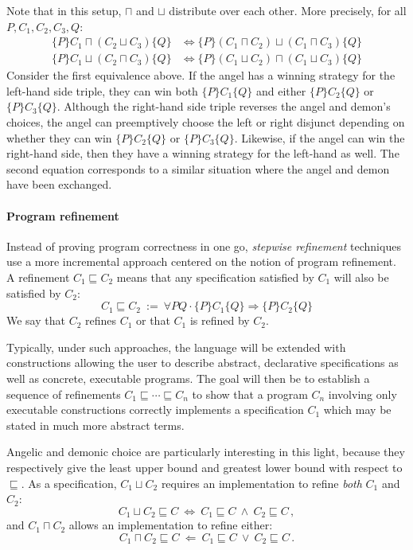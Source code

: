 \documentclass[format=sigplan,authordraft]{acmart}
\newcommand{\htr}[3]{{ \{{#1}\} {#2} \{{#3}\} }}
\begin{document}
Note that in this setup,
$\sqcap$ and $\sqcup$ distribute over each other.
More precisely, for all $P, C_1, C_2, C_3, Q$:
\begin{align*}
  \htr{P}{C_1 \sqcap (C_2 \sqcup C_3)}{Q} &\Leftrightarrow
    \htr{P}{(C_1 \sqcap C_2) \sqcup (C_1 \sqcap C_3)}{Q} \\
  \htr{P}{C_1 \sqcup (C_2 \sqcap C_3)}{Q} &\Leftrightarrow
    \htr{P}{(C_1 \sqcup C_2) \sqcap (C_1 \sqcup C_3)}{Q}
\end{align*}
Consider the first equivalence above.
If the angel has a winning strategy for
the left-hand side triple,
they can win both $\htr{P}{C_1}{Q}$
and either $\htr{P}{C_2}{Q}$ or $\htr{P}{C_3}{Q}$.
Although the right-hand side triple
reverses the angel and demon's choices,
the angel can preemptively choose the left or right
disjunct depending on whether they can win
$\htr{P}{C_2}{Q}$ or $\htr{P}{C_3}{Q}$.
Likewise, if the angel can win the right-hand side,
then they have a winning strategy for the left-hand as well.
The second equation corresponds to a similar situation
where the angel and demon have been exchanged.


\paragraph{Program refinement} %

Instead of proving program correctness in one go,
\emph{stepwise refinement} techniques use a more incremental approach
centered on the notion of program refinement.
A refinement $C_1 \sqsubseteq C_2$
means that any specification satisfied by $C_1$
will also be satisfied by $C_2$:
\[
    C_1 \sqsubseteq C_2 \: := \:
    \forall P Q \cdot
      \{P\} C_1 \{Q\} \Rightarrow
      \{P\} C_2 \{Q\}
\]
We say that $C_2$ refines $C_1$
or that $C_1$ is refined by $C_2$.

Typically,
under such approaches,
the language will be extended with constructions
allowing the user to describe
abstract, declarative specifications as well as
concrete, executable programs.
The goal will then be to establish
a sequence of refinements
$C_1 \sqsubseteq \cdots \sqsubseteq C_n$
to show that a program $C_n$ involving
only executable constructions
correctly implements a specification $C_1$
which may be stated in much more abstract terms.

Angelic and demonic choice
are particularly interesting in this light,
because they respectively give the
least upper bound and greatest lower bound
with respect to $\sqsubseteq$.
As a specification, $C_1 \sqcup C_2$
requires an implementation to refine
\emph{both} $C_1$ and $C_2$:
\[
    C_1 \sqcup C_2 \sqsubseteq C \: \Leftrightarrow \:
    C_1 \sqsubseteq C \: \wedge \: C_2 \sqsubseteq C \,,
\]
and $C_1 \sqcap C_2$
allows an implementation to refine
either:
\[
    C_1 \sqcap C_2 \sqsubseteq C \: \Leftarrow \:
    C_1 \sqsubseteq C \: \vee \: C_2 \sqsubseteq C \,.
\]
\end{document}
